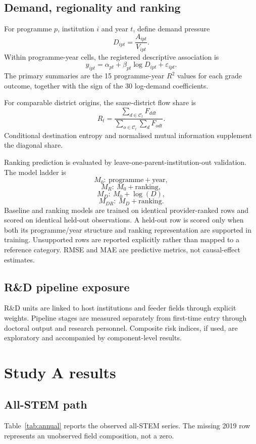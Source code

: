 \documentclass[11pt,a4paper]{article}
\begin{document}
\subsection{Demand, regionality and ranking}
For programme $p$, institution $i$ and year $t$, define demand pressure
\[
D_{ipt}=\frac{A_{ipt}}{V_{ipt}}.
\]
Within programme-year cells, the registered descriptive association is
\[
y_{ipt}=\alpha_{pt}+\beta_{pt}\log D_{ipt}+\varepsilon_{ipt}.
\]
The primary summaries are the 15 programme-year $R^2$ values for each grade outcome, together with the sign of the 30 log-demand coefficients.

For comparable district origins, the same-district flow share is
\[
R_t=\frac{\sum_{d\in\mathcal C_t}F_{ddt}}{\sum_{o\in\mathcal C_t}\sum_d F_{odt}}.
\]
Conditional destination entropy and normalised mutual information supplement the diagonal share.

Ranking prediction is evaluated by leave-one-parent-institution-out validation. The model ladder is
\[
M_0:\ \text{programme}+\text{year},
\]
\[
M_R:\ M_0+\text{ranking},
\]
\[
M_D:\ M_0+\log(D),
\]
\[
M_{DR}:\ M_D+\text{ranking}.
\]
Baseline and ranking models are trained on identical provider-ranked rows and scored on identical held-out observations. A held-out row is scored only when both its programme/year structure and ranking representation are supported in training. Unsupported rows are reported explicitly rather than mapped to a reference category. RMSE and MAE are predictive metrics, not causal-effect estimates.

\subsection{R\&D pipeline exposure}
R\&D units are linked to host institutions and feeder fields through explicit weights. Pipeline stages are measured separately from first-time entry through doctoral output and research personnel. Composite risk indices, if used, are exploratory and accompanied by component-level results.

\section{Study A results}
\subsection{All-STEM path}
Table~\ref{tab:annual} reports the observed all-STEM series. The missing 2019 row represents an unobserved field composition, not a zero.
\end{document}
